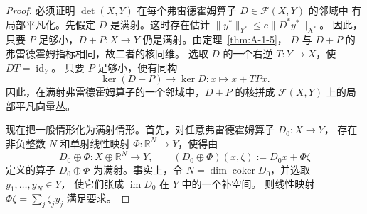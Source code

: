 \begin{proof}
必须证明 $\det(X,Y)$ 在每个弗雷德霍姆算子 $D\in\mathcal F(X,Y)$ 的邻域中
有局部平凡化。先假定 $D$ 是满射。这时存在估计
$\|y^*\|_{Y^*}\le c\|D^*y^*\|_{X^*}$。
因此，只要 $P$ 足够小，$D+P:X\to Y$ 仍是满射。由定理~\ref{thm:A-1-5}，
$D$ 与 $D+P$ 的弗雷德霍姆指标相同，故二者的核同维。
选取 $D$ 的一个右逆 $T:Y\to X$，使 $DT=\operatorname{id}_Y$。
只要 $P$ 足够小，便有同构
\[
  \ker(D+P)\longrightarrow\ker D:
  x\longmapsto x+TPx.
\]
因此，在满射弗雷德霍姆算子的一个邻域中，$D+P$ 的核拼成
$\mathcal F(X,Y)$ 上的局部平凡向量丛。

现在把一般情形化为满射情形。首先，对任意弗雷德霍姆算子 $D_0:X\to Y$，
存在非负整数 $N$ 和单射线性映射
$\Phi:\mathbb R^N\to Y$，使得由
\[
  D_0\oplus\Phi:X\oplus\mathbb R^N\longrightarrow Y,
  \qquad (D_0\oplus\Phi)(x,\zeta):=D_0x+\Phi\zeta
\]
定义的算子 $D_0\oplus\Phi$ 为满射。事实上，令
$N=\dim\operatorname{coker}D_0$，并选取 $y_1,\ldots,y_N\in Y$，
使它们张成 $\operatorname{im}D_0$ 在 $Y$ 中的一个补空间。
则线性映射 $\Phi\zeta=\sum_j\zeta_jy_j$ 满足要求。


\end{proof}
